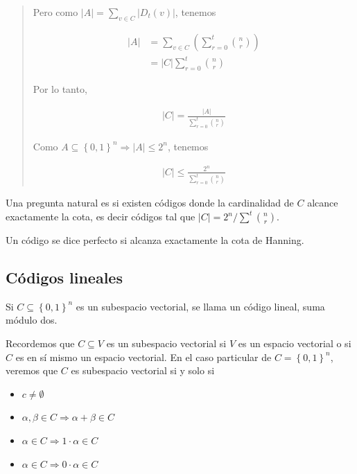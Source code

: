 \documentclass[a4paper]{article}
\begin{document}
\begin{quote}
    Pero como $|A| = \sum_{v \in C} |D_t(v)|$, tenemos 

    \begin{align*}
        |A| &= \sum_{v \in C} \left( \sum_{r=0}^{t} \binom{n}{r} \right) \\ 
            &= |C| \sum_{r=0}^{t} \binom{n}{r}
    \end{align*}

    Por lo tanto, 

    \begin{align*}
        |C| = \frac{|A|}{\sum_{r=0}^{t} \binom{n}{r}}
    \end{align*}

    Como $A \subseteq \left\{ 0,1 \right\}^n \Rightarrow |A| \leq 2^n $, tenemos 

    \begin{align*}
        |C| \leq \frac{2^n}{\sum_{r=0}^{t} \binom{n}{r}}
    \end{align*}

\end{quote}
\normalsize

Una pregunta natural es si existen códigos donde la cardinalidad de $C$ alcance 
exactamente la cota, es decir códigos tal que $|C| = 2^n / \sum^t \binom{n}{r}$.

\begin{definition}
    Un código se dice perfecto si alcanza exactamente la cota de Hanning.
\end{definition}

\subsection{Códigos lineales}

\begin{definition}
    Si $C \subseteq \left\{ 0, 1 \right\}^n $ es un subespacio vectorial, se llama 
    un código lineal, suma módulo dos.
\end{definition}

Recordemos que $C \subseteq V$ es un subespacio vectorial si $V$ es un espacio
vectorial o si $C$ es en sí mismo un espacio vectorial. En el caso 
particular de $C = \left\{ 0, 1 \right\}^n $, veremos que $C$ es subespacio 
vectorial si y solo si 

\begin{itemize}
    \item $c \neq \emptyset$ 
    \item $\alpha, \beta \in C \Rightarrow \alpha + \beta \in C$ 
    \item $\alpha \in C \Rightarrow 1 \cdot \alpha \in  C$
    \item $\alpha \in C \Rightarrow 0 \cdot \alpha \in  C$
\end{itemize}
\end{document}
